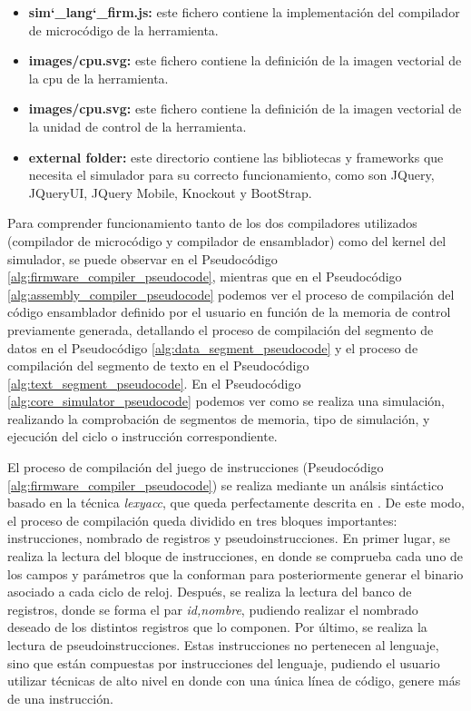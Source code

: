 \begin{itemize}
\item \textbf{sim\char`_lang\char`_firm.js: } este fichero contiene la implementación del compilador de microcódigo de la herramienta.

\item \textbf{images/cpu.svg: } este fichero contiene la definición de la imagen vectorial de la cpu de la herramienta.

\item \textbf{images/cpu.svg: } este fichero contiene la definición de la imagen vectorial de la unidad de control de la herramienta.

\item \textbf{external folder: } este directorio contiene las bibliotecas y frameworks que necesita el simulador para su correcto funcionamiento, como son JQuery, JQueryUI, JQuery Mobile, Knockout y BootStrap.

\end{itemize}

Para comprender funcionamiento tanto de los dos compiladores utilizados (compilador de microcódigo y compilador de ensamblador) como del kernel del simulador, se puede observar en el Pseudocódigo \ref{alg:firmware_compiler_pseudocode}, mientras que en el Pseudocódigo \ref{alg:assembly_compiler_pseudocode} podemos ver el proceso de compilación del código ensamblador definido por el usuario en función de la memoria de control previamente generada, detallando el proceso de compilación del segmento de datos en el Pseudocódigo \ref{alg:data_segment_pseudocode} y el proceso de compilación del segmento de texto en el Pseudocódigo \ref{alg:text_segment_pseudocode}. En el Pseudocódigo \ref{alg:core_simulator_pseudocode} podemos ver como se realiza una simulación, realizando la comprobación de segmentos de memoria, tipo de simulación, y ejecución del ciclo o instrucción correspondiente.

El proceso de compilación del juego de instrucciones (Pseudocódigo \ref{alg:firmware_compiler_pseudocode}) se realiza mediante un análsis sintáctico basado en la técnica \textit{\gls{lexyacc}}, que queda perfectamente descrita en \cite{bennett1996introduction}. De este modo, el proceso de compilación queda dividido en tres bloques importantes: instrucciones, nombrado de registros y pseudoinstrucciones. En primer lugar, se realiza la lectura del bloque de instrucciones, en donde se comprueba cada uno de los campos y parámetros que la conforman para posteriormente generar el binario asociado a cada ciclo de reloj. Después, se realiza la lectura del banco de registros, donde se forma el par \textit{id,nombre}, pudiendo realizar el nombrado deseado de los distintos registros que lo componen. Por último, se realiza la lectura de pseudoinstrucciones. Estas instrucciones no pertenecen al lenguaje, sino que están compuestas por instrucciones del lenguaje, pudiendo el usuario utilizar técnicas de alto nivel en donde con una única línea de código, genere más de una instrucción.

